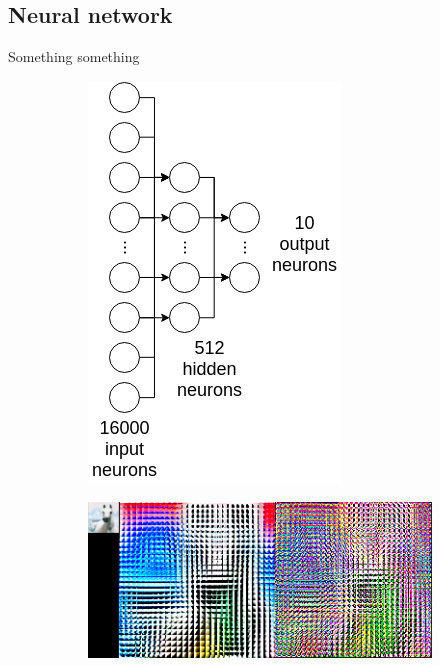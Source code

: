 \documentclass{article} %
\begin{document}
\subsection{Neural network}
\label{sub:neural}
    Something something
    \begin{figure}
        \centering
        \begin{subfigure}{.35\linewidth}
            \centering
            \includegraphics[width=.5\linewidth]{images/neural-architecture.png}
            \caption{}
        \end{subfigure}
        \begin{subfigure}{.43\linewidth}
            \centering
            \includegraphics[width=.75\linewidth]{images/normalize-zca.png}
        \caption{}
        \end{subfigure}
        \begin{subfigure}{.2\linewidth}
            \centering

\end{subfigure}
\end{figure}
\end{document}
